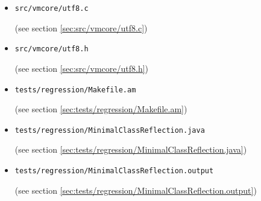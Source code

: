 \documentclass[a4paper, 10pt, titlepage]{scrartcl} %
\begin{document}
\begin{itemize}
 \item \begin{scriptsize}\verb|src|\hspace{0.0pt}\verb|/|\hspace{0.0pt}\verb|vmcore|\hspace{0.0pt}\verb|/|\hspace{0.0pt}\verb|utf8|\hspace{0.0pt}\verb|.|\hspace{0.0pt}\verb|c|\end{scriptsize} (see section \ref{sec:src/vmcore/utf8.c})
 \item \begin{scriptsize}\verb|src|\hspace{0.0pt}\verb|/|\hspace{0.0pt}\verb|vmcore|\hspace{0.0pt}\verb|/|\hspace{0.0pt}\verb|utf8|\hspace{0.0pt}\verb|.|\hspace{0.0pt}\verb|h|\end{scriptsize} (see section \ref{sec:src/vmcore/utf8.h})
 \item \begin{scriptsize}\verb|tests|\hspace{0.0pt}\verb|/|\hspace{0.0pt}\verb|regression|\hspace{0.0pt}\verb|/|\hspace{0.0pt}\verb|Makefile|\hspace{0.0pt}\verb|.|\hspace{0.0pt}\verb|am|\end{scriptsize} (see section \ref{sec:tests/regression/Makefile.am})
 \item \begin{scriptsize}\verb|tests|\hspace{0.0pt}\verb|/|\hspace{0.0pt}\verb|regression|\hspace{0.0pt}\verb|/|\hspace{0.0pt}\verb|MinimalClassReflection|\hspace{0.0pt}\verb|.|\hspace{0.0pt}\verb|java|\end{scriptsize} (see section \ref{sec:tests/regression/MinimalClassReflection.java})
 \item \begin{scriptsize}\verb|tests|\hspace{0.0pt}\verb|/|\hspace{0.0pt}\verb|regression|\hspace{0.0pt}\verb|/|\hspace{0.0pt}\verb|MinimalClassReflection|\hspace{0.0pt}\verb|.|\hspace{0.0pt}\verb|output|\end{scriptsize} (see section \ref{sec:tests/regression/MinimalClassReflection.output})

\end{itemize}
\end{document}
